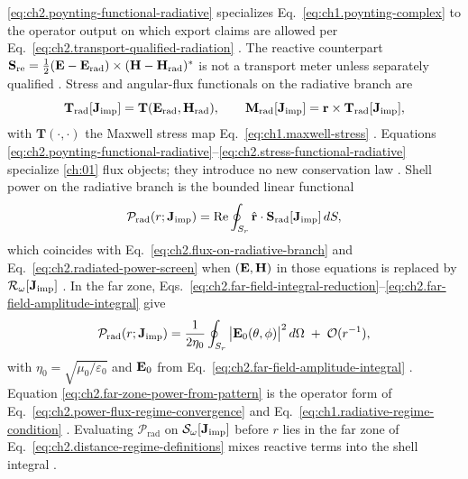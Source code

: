 \eqref{eq:ch2.poynting-functional-radiative} specializes
Eq.~\eqref{eq:ch1.poynting-complex} to the operator output on which export claims are
allowed per Eq.~\eqref{eq:ch2.transport-qualified-radiation} \cite{harrington2001}. The
reactive counterpart \(\mathbf{S}_{\mathrm{re}}=\tfrac12(\mathbf{E}-\mathbf{E}_{\mathrm{rad}})\times(\mathbf{H}-\mathbf{H}_{\mathrm{rad}})^*\)
is not a transport meter unless separately qualified \cite{stratton1941}. Stress and
angular-flux functionals on the radiative branch are
\begin{equation}
\label{eq:ch2.stress-functional-radiative}
\mathbf{T}_{\mathrm{rad}}[\mathbf{J}_{\mathrm{imp}}]
=
\mathbf{T}(\mathbf{E}_{\mathrm{rad}},\mathbf{H}_{\mathrm{rad}}),
\qquad
\mathbf{M}_{\mathrm{rad}}[\mathbf{J}_{\mathrm{imp}}]
=
\mathbf{r}\times\mathbf{T}_{\mathrm{rad}}[\mathbf{J}_{\mathrm{imp}}],
\end{equation}
with \(\mathbf{T}(\cdot,\cdot)\) the Maxwell stress map Eq.~\eqref{eq:ch1.maxwell-stress}
\cite{stratton1941}. Equations
\eqref{eq:ch2.poynting-functional-radiative}--\eqref{eq:ch2.stress-functional-radiative}
specialize \ref{ch:01} flux objects; they introduce no new conservation law
\cite{stratton1941}.
Shell power on the radiative branch is the bounded linear functional
\begin{equation}
\label{eq:ch2.power-flux-functional}
\mathcal{P}_{\mathrm{rad}}(r;\mathbf{J}_{\mathrm{imp}})
=
\Re\oint_{S_r}\hat{\mathbf{r}}\cdot\mathbf{S}_{\mathrm{rad}}[\mathbf{J}_{\mathrm{imp}}]\,dS,
\end{equation}
which coincides with Eq.~\eqref{eq:ch2.flux-on-radiative-branch} and
Eq.~\eqref{eq:ch2.radiated-power-screen} when \((\mathbf{E},\mathbf{H})\) in those equations is replaced
by \(\mathcal{R}_\omega[\mathbf{J}_{\mathrm{imp}}]\) \cite{stratton1941}. In the far zone,
Eqs.~\eqref{eq:ch2.far-field-integral-reduction}--\eqref{eq:ch2.far-field-amplitude-integral}
give
\begin{equation}
\label{eq:ch2.far-zone-power-from-pattern}
\mathcal{P}_{\mathrm{rad}}(r;\mathbf{J}_{\mathrm{imp}})
=
\frac{1}{2\eta_0}\oint_{S_r}
\big|\mathbf{E}_0(\theta,\phi)\big|^{2}\,d\Omega
\;+\;\mathcal{O}(r^{-1}),
\end{equation}
with \(\eta_0=\sqrt{\mu_0/\varepsilon_0}\) and \(\mathbf{E}_0\) from
Eq.~\eqref{eq:ch2.far-field-amplitude-integral} \cite{stratton1941}. Equation
\eqref{eq:ch2.far-zone-power-from-pattern} is the operator form of
Eq.~\eqref{eq:ch2.power-flux-regime-convergence} and
Eq.~\eqref{eq:ch1.radiative-regime-condition} \cite{stratton1941}.
Evaluating $\mathcal{P}_{\mathrm{rad}}$ on $\mathcal{S}_\omega[\mathbf{J}_{\mathrm{imp}}]$ before
$r$ lies in the far zone of Eq.~\eqref{eq:ch2.distance-regime-definitions} mixes reactive
terms into the shell integral \cite{harrington2001}.
